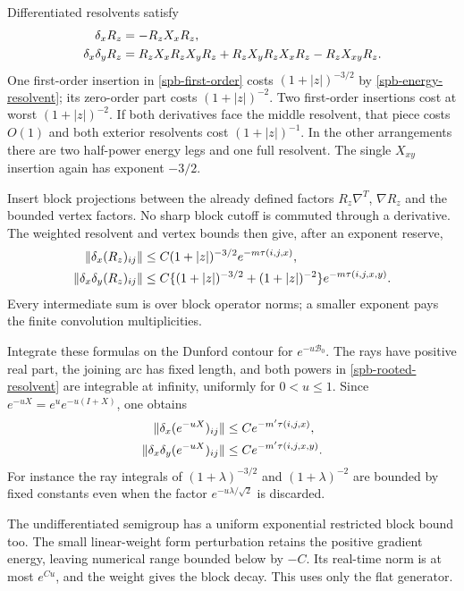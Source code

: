 \documentclass[11pt]{article}
\theoremstyle{remark}
\begin{document}
Differentiated resolvents satisfy
\begin{align}
 \delta_xR_z&=-R_zX_xR_z,\notag\\
 \delta_x\delta_yR_z
  &=R_zX_xR_zX_yR_z+R_zX_yR_zX_xR_z-R_zX_{xy}R_z.
 \label{spb-resolvent-derivatives}
\end{align}
One first-order insertion in \eqref{spb-first-order} costs
$(1+|z|)^{-3/2}$ by \eqref{spb-energy-resolvent}; its zero-order
part costs $(1+|z|)^{-2}$. Two first-order insertions cost at worst
$(1+|z|)^{-2}$. If both derivatives face the middle resolvent, that
piece costs $O(1)$ and both exterior resolvents cost
$(1+|z|)^{-1}$. In the other arrangements there are two half-power
energy legs and one full resolvent. The single $X_{xy}$ insertion
again has exponent $-3/2$.

Insert block projections between the already defined factors
$R_z\nabla^T$, $\nabla R_z$ and the bounded vertex factors.
No sharp block cutoff is commuted through a derivative. The weighted
resolvent and vertex bounds then give, after an exponent reserve,
\begin{align}
 \|\delta_x(R_z)_{ij}\|
  &\le C(1+|z|)^{-3/2}e^{-m\tau(i,j,x)},\notag\\
 \|\delta_x\delta_y(R_z)_{ij}\|
  &\le C\{(1+|z|)^{-3/2}+(1+|z|)^{-2}\}
                         e^{-m\tau(i,j,x,y)}.
 \label{spb-rooted-resolvent}
\end{align}
Every intermediate sum is over block operator norms; a smaller
exponent pays the finite convolution multiplicities.

Integrate these formulas on the Dunford contour for
$e^{-u\mathcal B_0}$. The rays have positive real part, the joining
arc has fixed length, and both powers in
\eqref{spb-rooted-resolvent} are integrable at infinity, uniformly
for $0<u\le1$. Since $e^{-uX}=e^u e^{-u(I+X)}$, one obtains
\begin{align}
 \|\delta_x(e^{-uX})_{ij}\|
     &\le Ce^{-m'\tau(i,j,x)},\notag\\
 \|\delta_x\delta_y(e^{-uX})_{ij}\|
     &\le Ce^{-m'\tau(i,j,x,y)}.
 \label{spb-rooted-semigroup}
\end{align}
For instance the ray integrals of $(1+\lambda)^{-3/2}$ and
$(1+\lambda)^{-2}$ are bounded by fixed constants even when the
factor $e^{-u\lambda/\sqrt2}$ is discarded.

The undifferentiated semigroup has a uniform exponential restricted
block bound too. The small linear-weight form perturbation retains
the positive gradient energy, leaving numerical range bounded below
by $-C$. Its real-time norm is at most $e^{Cu}$, and the weight gives
the block decay. This uses only the flat generator.
\end{document}
